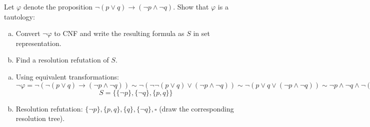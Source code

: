 \begin{problem}

    Let $\varphi$ denote the proposition $\neg (p \vee q) \to (\neg p \wedge \neg q)$. Show that $\varphi$ is a tautology:
    \begin{enumerate}[(a)]
        \item Convert $\neg \varphi$ to CNF and write the resulting formula as $S$ in set representation.
        \item Find a resolution refutation of $S$.
    \end{enumerate}

    \begin{solution}

        \begin{enumerate}[(a)]
            \item Using equivalent transformations: $\neg\varphi=\neg(\neg (p \vee q) \to (\neg p \wedge \neg q))\sim\neg(\neg \neg (p \vee q) \lor (\neg p \wedge \neg q))\sim\neg(p \vee q \vee (\neg p \wedge \neg q))\sim \neg p \land \neg q \land  \neg (\neg p \wedge \neg q)\sim\neg p \land \neg q \land  (p \lor q)$
            $$
            S = \{\{\neg p\},\{\neg q\},\{p,q\}\}
            $$
            \item Resolution refutation: $\{\neg p\},\{p,q\},\{q\},\{\neg q\},\square$ (draw the corresponding resolution tree).
        \end{enumerate}
                    
    \end{solution}

\end{problem}


